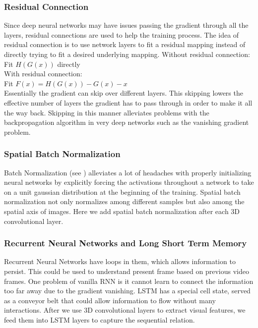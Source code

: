 \documentclass[10pt,twocolumn,letterpaper]{article}
\begin{document}
\subsubsection{Residual Connection}
Since deep neural networks may have issues passing the gradient through all the layers, residual connections are used to help the training process. The idea of residual connection is to use network layers to fit a residual mapping instead of directly trying to fit a desired underlying mapping. 
Without residual connection:\\
Fit $H(G(x))$ directly\\
With residual connection:\\
Fit $F(x)=H(G(x))-G(x)-x$\\
Essentially the gradient can skip over different layers. This skipping lowers the effective number of layers the gradient has to pass through in order to make it all the way back. Skipping in this manner alleviates problems with the backpropagation algorithm in very deep networks such as the vanishing gradient problem.

\subsubsection{Spatial Batch Normalization}
Batch Normalization (see \cite{ioffe2015batch}) alleviates a lot of headaches with properly initializing neural networks by explicitly forcing the activations throughout a network to take on a unit gaussian distribution at the beginning of the training. Spatial batch normalization not only normalizes among different samples but also among the spatial axis of images. Here we add spatial batch normalization after each 3D convolutional layer.

\subsubsection{Recurrent Neural Networks and Long Short Term Memory}
Recurrent Neural Networks have loops in them, which allows information to persist. This could be used to understand present frame based on previous video frames. One problem of vanilla RNN is it cannot learn to connect the information too far away due to the gradient vanishing. LSTM has a special cell state, served as a conveyor belt that could allow information to flow without many interactions. After we use 3D convolutional layers to extract visual features, we feed them into LSTM layers to capture the sequential relation.
\end{document}
